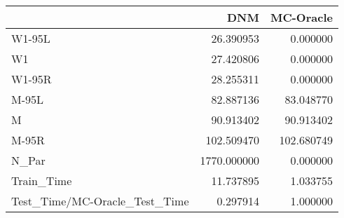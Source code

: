 \begin{tabular}{lrr}
\toprule
{} &          DNM &   MC-Oracle \\
\midrule
W1-95L                        &    26.390953 &    0.000000 \\
W1                            &    27.420806 &    0.000000 \\
W1-95R                        &    28.255311 &    0.000000 \\
M-95L                         &    82.887136 &   83.048770 \\
M                             &    90.913402 &   90.913402 \\
M-95R                         &   102.509470 &  102.680749 \\
N\_Par                         &  1770.000000 &    0.000000 \\
Train\_Time                    &    11.737895 &    1.033755 \\
Test\_Time/MC-Oracle\_Test\_Time &     0.297914 &    1.000000 \\
\bottomrule
\end{tabular}
